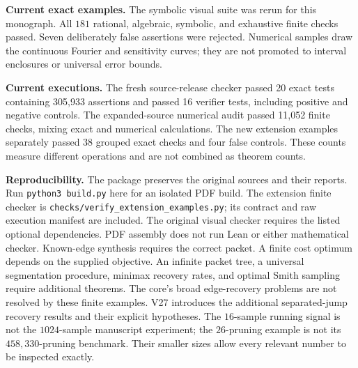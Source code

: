 \textbf{Current exact examples.} The symbolic visual suite was rerun for this monograph. All $181$ rational, algebraic, symbolic, and exhaustive finite checks passed. Seven deliberately false assertions were rejected. Numerical samples draw the continuous Fourier and sensitivity curves; they are not promoted to interval enclosures or universal error bounds.

\textbf{Current executions.} The fresh source-release checker passed 20 exact tests containing 305,933 assertions and passed 16 verifier tests, including positive and negative controls. The expanded-source numerical audit passed 11,052 finite checks, mixing exact and numerical calculations. The new extension examples separately passed 38 grouped exact checks and four false controls. These counts measure different operations and are not combined as theorem counts.\par
\textbf{Reproducibility.} The package preserves the original sources and their reports. Run \texttt{python3 build.py} here for an isolated PDF build. The extension finite checker is \texttt{checks/verify\_extension\_examples.py}; its contract and raw execution manifest are included. The original visual checker requires the listed optional dependencies. PDF assembly does not run Lean or either mathematical checker.
Known-edge synthesis requires the correct packet. A finite cost optimum depends on the supplied objective. An infinite packet tree, a universal segmentation procedure, minimax recovery rates, and optimal Smith sampling require additional theorems. The core's broad edge-recovery problems are not resolved by these finite examples. V27 introduces the additional separated-jump recovery results and their explicit hypotheses.
The $16$-sample running signal is not the $1024$-sample manuscript experiment; the $26$-pruning example is not its $458{,}330$-pruning benchmark. Their smaller sizes allow every relevant number to be inspected exactly.

